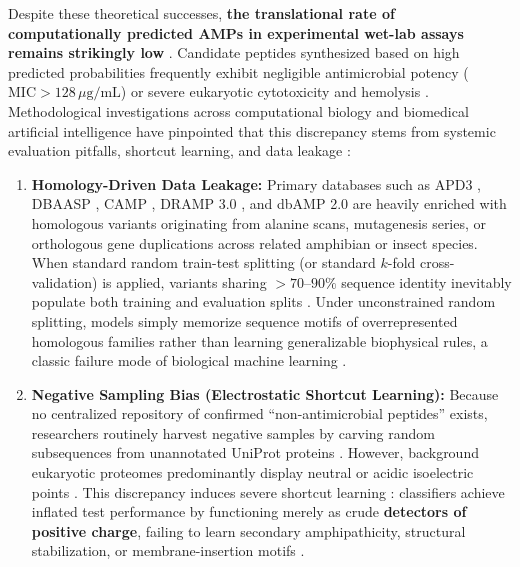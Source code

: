 \documentclass[11pt,a4paper]{article}
\begin{document}
Despite these theoretical successes, \textbf{the translational rate of computationally predicted AMPs in experimental wet-lab assays remains strikingly low} \cite{cardoso2020computer, porto2018silico, torres2019synthetic, capecchi2021machine}. Candidate peptides synthesized based on high predicted probabilities frequently exhibit negligible antimicrobial potency ($\text{MIC} > 128\,\mu\text{g/mL}$) or severe eukaryotic cytotoxicity and hemolysis \cite{cardoso2020computer, torres2019synthetic}. Methodological investigations across computational biology and biomedical artificial intelligence have pinpointed that this discrepancy stems from systemic evaluation pitfalls, shortcut learning, and data leakage \cite{bernett2024guiding, pintor2026antimicrobial, sidorczuk2022benchmarks, geirhos2020shortcut, kapoor2023leakage, whalen2022navigating, roberts2021common, park2012flaw, walsh2021dome}:

\begin{enumerate}
    \item \textbf{Homology-Driven Data Leakage:} Primary databases such as APD3 \cite{wang2016apd3}, DBAASP \cite{pirtskhalava2021dbaasp}, CAMP \cite{waghu2016camp}, DRAMP 3.0 \cite{shi2022dramp}, and dbAMP 2.0 \cite{jhong2022dbamp} are heavily enriched with homologous variants originating from alanine scans, mutagenesis series, or orthologous gene duplications across related amphibian or insect species. When standard random train-test splitting (or standard $k$-fold cross-validation) is applied, variants sharing $>70$--$90\%$ sequence identity inevitably populate both training and evaluation splits \cite{bernett2024guiding, pintor2026antimicrobial}. Under unconstrained random splitting, models simply memorize sequence motifs of overrepresented homologous families rather than learning generalizable biophysical rules, a classic failure mode of biological machine learning \cite{whalen2022navigating, bernett2024guiding, kapoor2023leakage}.
    \item \textbf{Negative Sampling Bias (Electrostatic Shortcut Learning):} Because no centralized repository of confirmed ``non-antimicrobial peptides'' exists, researchers routinely harvest negative samples by carving random subsequences from unannotated UniProt proteins \cite{sidorczuk2022benchmarks}. However, background eukaryotic proteomes predominantly display neutral or acidic isoelectric points \cite{kiraga2007relationships}. This discrepancy induces severe shortcut learning \cite{geirhos2020shortcut}: classifiers achieve inflated test performance by functioning merely as crude \textbf{detectors of positive charge}, failing to learn secondary amphipathicity, structural stabilization, or membrane-insertion motifs \cite{sidorczuk2022benchmarks, pintor2026antimicrobial}.
\end{enumerate}
\end{document}

